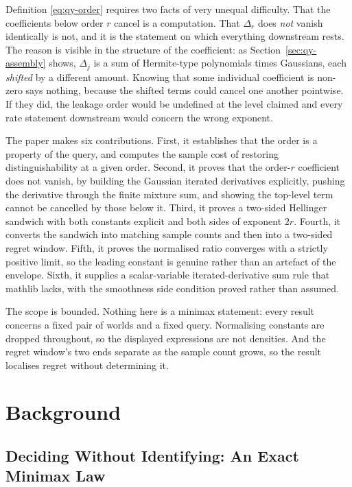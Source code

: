 Definition \eqref{eq:qy-order} requires two facts of very unequal difficulty. That the
coefficients below order $r$ cancel is a computation. That $\Delta_{r}$ does \emph{not}
vanish identically is not, and it is the statement on which everything downstream rests. The
reason is visible in the structure of the coefficient: as
Section~\ref{sec:qy-assembly} shows, $\Delta_{j}$ is a sum of Hermite-type polynomials times
Gaussians, each \emph{shifted} by a different amount. Knowing that some individual
coefficient is non-zero says nothing, because the shifted terms could cancel one another
pointwise. If they did, the leakage order would be undefined at the level claimed and every
rate statement downstream would concern the wrong exponent.

The paper makes six contributions. First, it establishes that the order is a property of the
query, and computes the sample cost of restoring distinguishability at a given order. Second,
it proves that the order-$r$ coefficient does not vanish, by building the Gaussian iterated
derivatives explicitly, pushing the derivative through the finite mixture sum, and showing
the top-level term cannot be cancelled by those below it. Third, it proves a two-sided
Hellinger sandwich with both constants explicit and both sides of exponent $2r$. Fourth, it
converts the sandwich into matching sample counts and then into a two-sided regret window.
Fifth, it proves the normalised ratio converges with a strictly positive limit, so the
leading constant is genuine rather than an artefact of the envelope. Sixth, it supplies a
scalar-variable iterated-derivative sum rule that mathlib lacks, with the smoothness side
condition proved rather than assumed.

The scope is bounded. Nothing here is a minimax statement: every result concerns a fixed
pair of worlds and a fixed query. Normalising constants are dropped throughout, so the
displayed expressions are not densities. And the regret window's two ends separate as the
sample count grows, so the result localises regret without determining it.


\section{Background}

\subsection{Deciding Without Identifying: An Exact Minimax Law}

